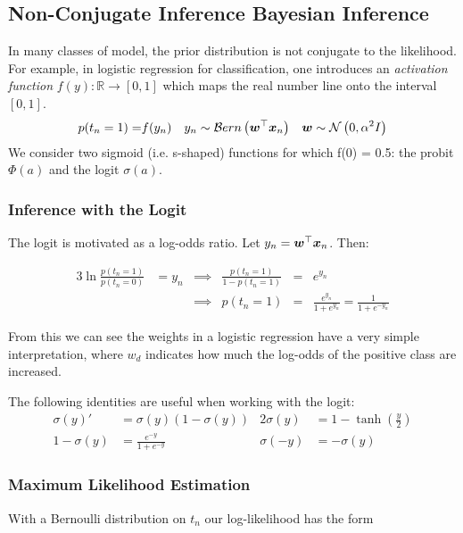 


\subsection{Non-Conjugate Inference Bayesian Inference}
\label{sec:nonconj}
In many classes of model, the prior distribution is not conjugate to the likelihood. For example, in logistic regression for classification, one introduces an \emph{activation function} $f(y) : \mathbb{R} \rightarrow [0, 1]$ which maps the real number line onto the interval $[0,1]$.
\begin{align*}
p(t_n = 1) = & f(y_n) & y_n  & \sim \mathcal{B}ern \left( \bm w^\top\bm x_n\right) & \bm w & \sim \mathcal{N} \left( {0}, {\alpha^2 I} \right) \\
\end{align*}
We consider two sigmoid (i.e. s-shaped) functions for which f(0) = 0.5: the probit $\Phi(a)$ and the logit $\sigma(a)$.

\subsubsection{Inference with the Logit}
The logit is motivated as a log-odds ratio. Let $y_n = \bm w^\top\bm x_n$. Then:

\begin{alignat}{3}
\ln \frac{p(t_n = 1)}{p(t_n = 0)}  & = y_n  &
\implies & \frac{p(t_n = 1)}{1 - p(t_n = 1)}  & = & e^{y_n} \\
& & \implies &  p(t_n = 1)                    & = & \frac{e^{y_n}}{1 + e^{y_n}} = \frac{1}{1+e^{-y_n}}
\end{alignat}

From this we can see the weights in a logistic regression have a very simple interpretation, where $w_d$ indicates how much the log-odds of the positive class are increased.

The following identities are useful when working with the logit:
\begin{align}
\sigma(y)' & = \sigma(y)(1 - \sigma(y)) \label{eqn:sigma-identity} &
2 \sigma(y) & = 1 - \tanh (\frac{y}{2}) \\
1 - \sigma(y) & = \frac{e^{-y}}{1 + e^{-y}} &
\sigma(-y) & = -\sigma(y)
\end{align}


\subsubsection*{Maximum Likelihood Estimation}
With a Bernoulli distribution on $t_n$ our log-likelihood has the form

